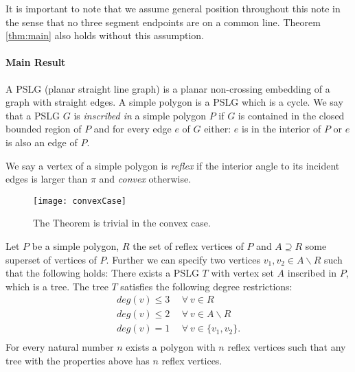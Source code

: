 \documentclass[12pt]{article}
\begin{document}
It is important to note that we assume general position throughout this note in the sense that no three segment endpoints are on a common line. Theorem \ref{thm:main} also holds without this assumption.


\paragraph{Main Result}
A PSLG (planar straight line graph) is a planar non-crossing embedding of a graph with straight edges. 
A simple polygon is a PSLG which is a cycle. We say that a PSLG $G$ is \emph{inscribed in} a simple polygon $P$ if  $G$ is contained in the closed bounded region of $P$ and for every edge $e$ of $G$ either: $e$ is in the interior of $P$ or
 $e$ is also an edge of $P$.

We say a vertex of a simple polygon is \emph{reflex} if the interior angle to its incident edges is larger than $\pi$ and \emph{convex} otherwise. 
	\begin{figure}[h]
			\begin{center}
			\texttt{[image: convexCase]}
				\caption{The Theorem is trivial in the convex case.}
				\label{fig:convexCase}
			\end{center}
	\end{figure} 
\begin{theorem}\label{thm:main}
	Let $P$ be a simple polygon, $R$ the set of reflex vertices of $P$ and $A\supseteq R$ some superset of vertices of $P$. Further we can specify two vertices $v_1,v_2 \in A\backslash R$ such that the following holds:
	There exists a PSLG $T$ with vertex set $A$ inscribed in $P$, which is a tree. The tree $T$ satisfies the following degree restrictions:
$$
\begin{array}{rl}
	 deg(v) \leq  3 & \ \ \forall \ v\in R  \\
	 deg(v)  \leq  2 & \ \ \forall \ v\in A\backslash R  \\
	 deg(v)  =  1 & \ \ \forall \ v\in \{ v_1, v_2 \}.  \\
	\end{array}
	$$
	For every natural number $n$ exists a polygon with $n$ reflex vertices
	such that any tree with the properties above has $n$ reflex vertices.
\end{theorem}
\end{document}
